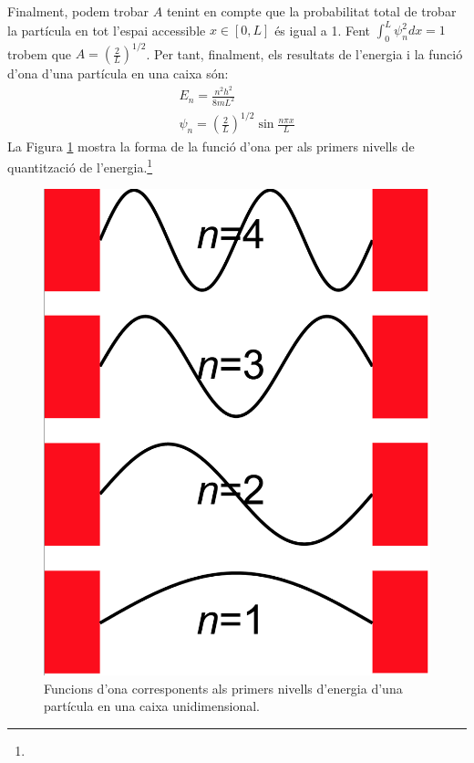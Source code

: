 \begin{mdframed}[backgroundcolor=gray!30,frametitle=Partícula en una caixa]
\[\]
Finalment, podem trobar $A$ tenint en compte que la probabilitat total de trobar la partícula en tot l'espai accessible $x\in [0,L]$ és igual a 1. Fent $\int_0^L \psi^2_n dx =1$ trobem que $A=\left( \frac{2}{L} \right)^{1/2}$. Per tant, finalment, els resultats de l'energia i la funció d'ona d'una partícula en una caixa són:
\begin{eqnarray}
E_n=\frac{n^2h^2}{8mL^2}\\
\psi_n= \left( \frac{2}{L} \right)^{1/2} \sin{\frac{n\pi x}{L}}
\end{eqnarray}
La Figura \ref{fig:ParticulaCaixa2} mostra la forma de la funció d'ona per als primers nivells de quantització de l'energia.\footnote{}
\end{mdframed}
\begin{figure}[h]
\centering
\includegraphics[scale=0.3]{figures/ParticulaCaixa2.png}
\caption{Funcions d'ona corresponents als primers nivells d'energia d'una partícula en una caixa unidimensional.}
\label{fig:ParticulaCaixa2}
\end{figure}
